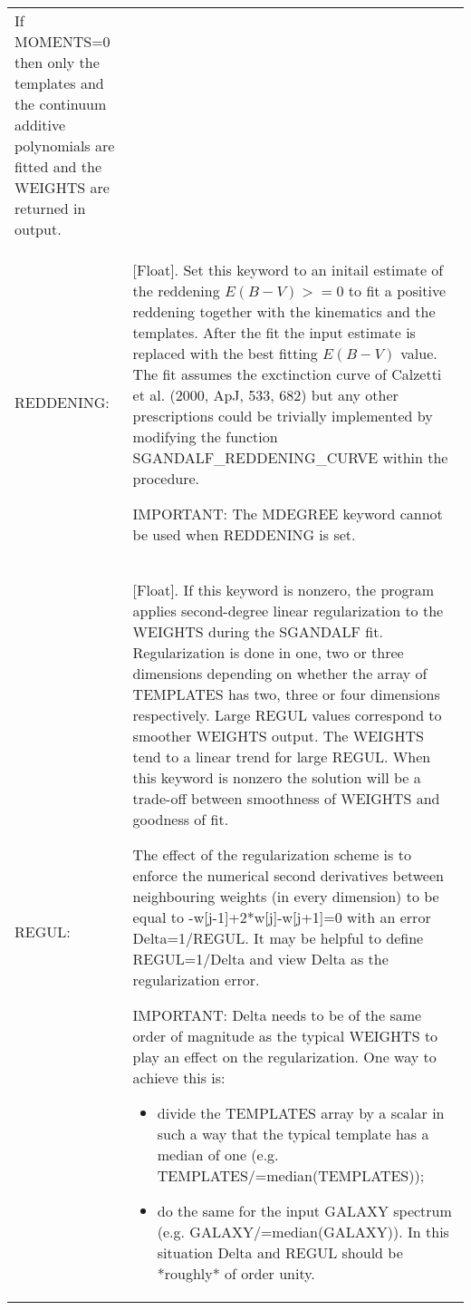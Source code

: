\begin{center}
\begin{longtable}{p{2.7cm}| p{11.1cm}}
       If MOMENTS=0 then only the templates and the continuum additive
       polynomials are fitted and the WEIGHTS are returned in output.\\
%
  REDDENING: & [Float]. Set this keyword to an initail estimate of the reddening $E(B-V)>=0$
      to fit a positive reddening together with the kinematics and the templates.
      After the fit the input estimate is replaced with the best fitting $E(B-V)$ value.
      The fit assumes the exctinction curve of Calzetti et al. (2000, ApJ, 533, 682)
      but any other prescriptions could be trivially implemented by modifying the
      function SGANDALF\_REDDENING\_CURVE within the procedure.

      IMPORTANT: The MDEGREE keyword cannot be used when REDDENING is set. \\
%
   REGUL:  & [Float]. If this keyword is nonzero, the program applies second-degree
       linear regularization to the WEIGHTS during the SGANDALF fit.
       Regularization is done in one, two or three dimensions depending on whether
       the array of TEMPLATES has two, three or four dimensions respectively.
       Large REGUL values correspond to smoother WEIGHTS output. The WEIGHTS tend
       to a linear trend for large REGUL. When this keyword is nonzero the solution
       will be a trade-off between smoothness of WEIGHTS and goodness of fit.

       The effect of the regularization scheme is to enforce the numerical second 
       derivatives between neighbouring weights (in every dimension) to be equal 
       to -w[j-1]+2*w[j]-w[j+1]=0 with an error Delta=1/REGUL. It may be helpful 
       to define REGUL=1/Delta and view Delta as the regularization error.

      IMPORTANT: Delta needs to be of the same order of magnitude as the typical 
       WEIGHTS to play an effect on the regularization. One way to achieve this is: 
     \begin{itemize}
       \item divide the TEMPLATES array by a scalar in such a way that the typical 
         template has a median of one (e.g. TEMPLATES/=median(TEMPLATES)); 
       \item do the same for the input GALAXY spectrum (e.g. GALAXY/=median(GALAXY)). 
         In this situation Delta and REGUL should be *roughly* of order unity. 
     \end{itemize}


\end{longtable}
\end{center}
